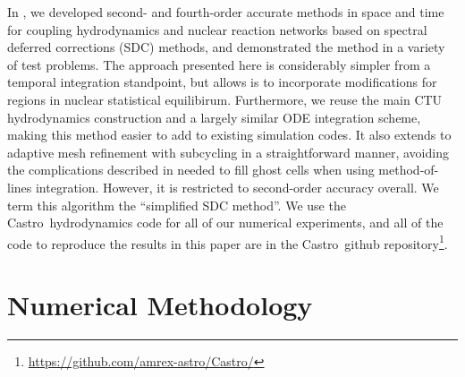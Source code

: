 \documentclass[times,modern]{aastex63}
\newcommand{\castro}{{\sf Castro}}
\begin{document}
In \cite{castro_sdc}, we developed second- and fourth-order accurate
methods in space and time for coupling hydrodynamics and nuclear
reaction networks based on spectral deferred corrections (SDC)
methods, and demonstrated the method in a variety of test problems.
The approach presented here is considerably simpler from a temporal
integration standpoint, but allows is to incorporate modifications
for regions in nuclear statistical equilibirum.
Furthermore, we reuse the main
CTU hydrodynamics construction and a largely similar ODE integration
scheme, making this method easier to add to existing simulation codes.
It also extends to adaptive mesh refinement with subcycling in a
straightforward manner, avoiding the complications described in
\citep{mccorquodalecolella} needed to fill ghost cells when using
method-of-lines integration.  However, it is restricted to
second-order accuracy overall.  We term this algorithm the
``simplified SDC method''.  We use the \castro\ hydrodynamics code
\citep{castro} for all of our numerical experiments, and all of the
code to reproduce the results in this paper are in the \castro\ github
repository\footnote{\url{https://github.com/amrex-astro/Castro/}}.

\section{Numerical Methodology}
\end{document}
